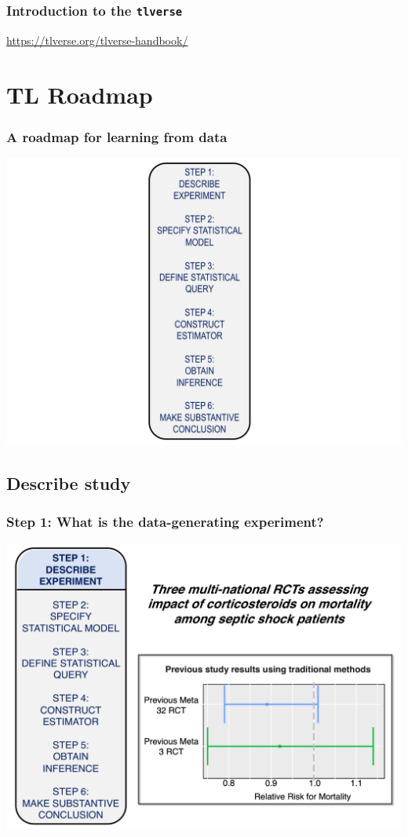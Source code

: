 \documentclass[t]{beamer}
\begin{document}
\begin{frame}
  \frametitle{Introduction to the \texttt{tlverse}}
  \url{https://tlverse.org/tlverse-handbook/}
\end{frame}

\section{TL Roadmap}

\begin{frame}
  \frametitle{A roadmap for learning from data}
  \vspace{-20pt}
  \begin{center}
  \includegraphics[width = 1.05\textwidth]{figures/roadmap.pdf}
  \end{center}
\end{frame}

\subsection{Describe study}
\begin{frame}
  \frametitle{Step 1: What is the data-generating experiment?}
  \vspace{-20pt}
  \begin{center}
  \includegraphics[width = 1.05\textwidth]{figures/roadmap1_1.pdf}
  \end{center}
\end{frame}
\end{document}
